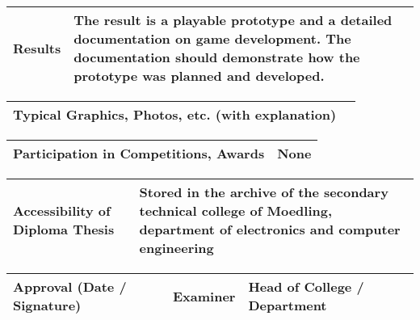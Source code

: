 \vspace{10pt}

\noindent
\begin{tabular}{|m{}|m{}|}
\hline
Results & The result is a playable prototype and a detailed documentation on game development. The documentation should demonstrate how the prototype was planned and developed.  \\
\hline
\end{tabular}

\pagebreak

\noindent
\begin{tabular}{|m{}|m{}|}
\hline
Typical Graphics, Photos, etc. (with explanation) & \\
\hline
\end{tabular}

\vspace{10pt}

\noindent
\begin{tabular}{|m{}|m{}|}
\hline
Participation in Competitions, Awards & None \\
\hline
\end{tabular}

\vspace{10pt}

\noindent
\begin{tabular}{|m{}|m{}|}
\hline
Accessibility of \newline Diploma Thesis & Stored in the archive of the secondary technical college of Moedling, department of electronics and computer engineering \\
\hline
\end{tabular}

\vspace{10pt}

\noindent
\begin{tabular}{|m{}|m{}|m{}|}
\hline
Approval (Date / Signature) & {\tiny Examiner \newline \newline} & {\tiny Head of College / Department \newline \newline} \\
\hline
\end{tabular}